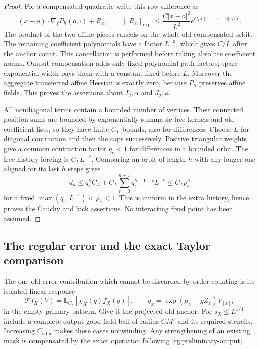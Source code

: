 \begin{proof}
For a compensated quadratic write this row difference as
\[
 (x-o)\cdot\nabla_fP_h(o,\cdot)+R_x,
 \qquad
 \|R_x\|_{\exp}\le
        \frac{C|x-o|^2}{L^2}e^{C_1\sigma(1+|x-o|/L)}.
\]
The product of the two affine pieces cancels on the whole old
compensated orbit.  The remaining coefficient polynomials have a
factor $L^{-3}$, which gives $C/L$ after the anchor count.  This
cancellation is performed before taking absolute coefficient norms.
Output compensation adds only fixed polynomial path factors; spare
exponential width pays them with a constant fixed before $L$.
Moreover the aggregate transferred affine Hessian is exactly zero,
because $P_h$ preserves affine fields.  This proves the assertions
about $I_2,\alpha$ and $J_2,\kappa$.

All nondiagonal terms contain a bounded number of vertices.  Their
connected position sums are bounded by exponentially summable free
kernels and old coefficient lists, so they have finite $C_L$ bounds,
also for differences.  Choose $L$ for diagonal contraction and then
the caps successively.  Positive triangular weights give a common
contraction factor $q_c<1$ for differences in a bounded orbit.
The free-history forcing is $C_L L^{-h}$.  Comparing an orbit of
length $h$ with any longer one aligned for its last $h$ steps gives
\[
 d_h\le q_c^h C_L+
             C_L\sum_{r=0}^{h-1}q_c^{h-1-r}L^{-r}
                \le C_L\rho_c^h
\]
for a fixed $\max(q_c,L^{-1})<\rho_c<1$.
This is uniform in the extra history, hence proves the Cauchy and
kick assertions.  No interacting fixed point has been assumed.
\end{proof}

\subsection{The regular error and the exact Taylor comparison}
\label{rg:error}

The one old-error contribution which cannot be discarded by order
counting is its isolated linear response
\begin{equation}
 \mathcal T f_X(V)=\mathbb E_{C_s}
       [\chi_X(q)f_X(q)],\qquad
 q_x=\exp(\mu_x+gZ_x)V_{[x]},
 \label{rg:error-transfer}
\end{equation}
in the empty primary pattern.  Give it the projected old anchor.
For $s_X\le L^{1/4}$ include a complete output good-field ball of
radius $CM'$ and its required stencils.  Increasing $C_{\mathrm{adm}}$
makes these cases nonwinding.  Any strengthening of an existing
mask is compensated by the exact operation following
\eqref{rg:preliminary-output}.

